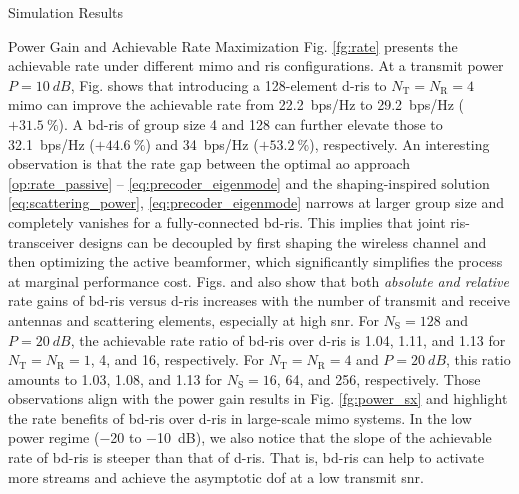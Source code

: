 \begin{section}{Simulation Results}
\begin{subsection}{Power Gain and Achievable Rate Maximization}
	 Fig. \ref{fg:rate} presents the achievable rate under different \gls{mimo} and \gls{ris} configurations.
	 At a transmit power $P = \qty{10}{dB}$, Fig.  shows that introducing a 128-element \gls{d}-\gls{ris} to $N_\mathrm{T}=N_\mathrm{R}=4$ \gls{mimo} can improve the achievable rate from \qty{22.2}{bps/Hz} to \qty{29.2}{bps/Hz} ($+\qty{31.5}{\percent}$).
	 A \gls{bd}-\gls{ris} of group size 4 and 128 can further elevate those to \qty{32.1}{bps/Hz} ($+\qty{44.6}{\percent}$) and \qty{34}{bps/Hz}  ($+\qty{53.2}{\percent}$), respectively.
	 An interesting observation is that the rate gap between the optimal \gls{ao} approach \eqref{op:rate_passive} -- \eqref{eq:precoder_eigenmode} and the shaping-inspired solution \eqref{eq:scattering_power}, \eqref{eq:precoder_eigenmode} narrows at larger group size and completely vanishes for a fully-connected \gls{bd}-\gls{ris}.
	 This implies that joint \gls{ris}-transceiver designs can be decoupled by first shaping the wireless channel and then optimizing the active beamformer, which significantly simplifies the process at marginal performance cost.
	 Figs.  and  also show that both \emph{absolute and relative} rate gains of \gls{bd}-\gls{ris} versus \gls{d}-\gls{ris}
	 increases with the number of transmit and receive antennas and scattering elements, especially at high \gls{snr}.
	 For $N_\mathrm{S}=128$ and $P = \qty{20}{dB}$,
	 the achievable rate ratio of \gls{bd}-\gls{ris} over \gls{d}-\gls{ris} is \num{1.04}, \num{1.11}, and \num{1.13} for $N_\mathrm{T}=N_\mathrm{R}=1$, \num{4}, and \num{16}, respectively.
	 For $N_\mathrm{T}=N_\mathrm{R}=4$ and $P = \qty{20}{dB}$, this ratio amounts to \num{1.03}, \num{1.08}, and \num{1.13} for $N_\mathrm{S}=16$, \num{64}, and \num{256}, respectively.
	 Those observations align with the power gain results in Fig. \ref{fg:power_sx} and highlight the rate benefits of \gls{bd}-\gls{ris} over \gls{d}-\gls{ris} in large-scale \gls{mimo} systems.
	 In the low power regime (\num{-20} to \qty{-10}{dB}), we also notice that the slope of the achievable rate of \gls{bd}-\gls{ris} is steeper than that of \gls{d}-\gls{ris}.
	 That is, \gls{bd}-\gls{ris} can help to activate more streams and achieve the asymptotic \gls{dof} at a low transmit \gls{snr}.

\end{subsection}
\end{section}
